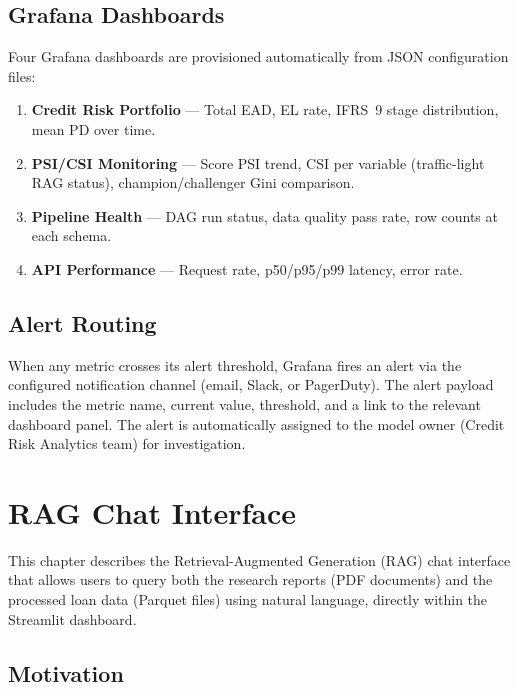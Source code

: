 \documentclass[12pt,a4paper]{report}
\begin{document}
\section{Grafana Dashboards}

Four Grafana dashboards are provisioned automatically from JSON configuration files:

\begin{enumerate}
  \item \textbf{Credit Risk Portfolio} --- Total EAD, EL rate, IFRS~9 stage distribution, mean PD over time.
  \item \textbf{PSI/CSI Monitoring} --- Score PSI trend, CSI per variable (traffic-light RAG status), champion/challenger Gini comparison.
  \item \textbf{Pipeline Health} --- DAG run status, data quality pass rate, row counts at each schema.
  \item \textbf{API Performance} --- Request rate, p50/p95/p99 latency, error rate.
\end{enumerate}

\section{Alert Routing}

When any metric crosses its alert threshold, Grafana fires an alert via the configured notification channel (email, Slack, or PagerDuty). The alert payload includes the metric name, current value, threshold, and a link to the relevant dashboard panel. The alert is automatically assigned to the model owner (Credit Risk Analytics team) for investigation.

\chapter{RAG Chat Interface}
\label{ch:rag}

This chapter describes the Retrieval-Augmented Generation (RAG) chat interface that allows users to query both the research reports (PDF documents) and the processed loan data (Parquet files) using natural language, directly within the Streamlit dashboard.

\section{Motivation}
\end{document}
